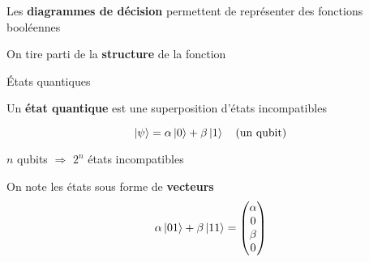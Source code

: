 \begin{frame}
    Les \textbf{diagrammes de décision} permettent de représenter des fonctions booléennes

    \vspace{1em}
    \begin{center}

    \vspace{1em}

    On tire parti de la \textbf{structure} de la fonction
    \end{center}
\end{frame}

\begin{frame}{États quantiques}

    Un \textbf{état quantique} est une superposition d'états incompatibles

    $$\ket{\psi} = \alpha \ket{0} + \beta \ket{1} \quad \text{(un qubit)}$$

    \pause
    \begin{center}
        $n$ qubits $\Rightarrow$ $2^n$ états incompatibles
    \end{center}
On note les états sous forme de \textbf{vecteurs}
$$\alpha \ket {01} + \beta \ket {11} = \begin{pmatrix}
    \alpha \\ 0 \\ \beta \\ 0
\end{pmatrix}$$
\end{frame}

